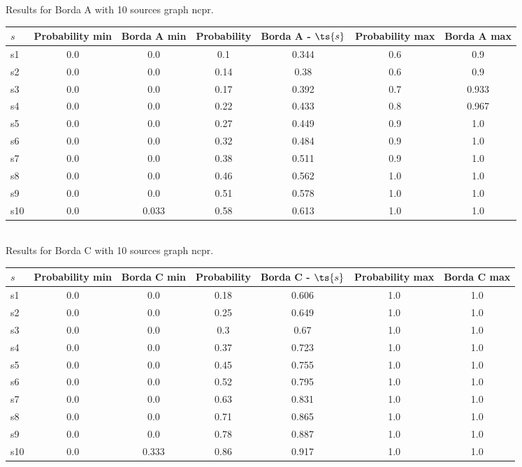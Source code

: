 \documentclass{article}
\begin{document}
\noindent Results for Borda A with 10 sources graph ncpr.

\noindent\begin{tabular}{|l|c|c|c|c|c|c|}
\hline
$s$& Probability min & Borda A min & Probability & Borda A - $\ts{s}$ & Probability max & Borda A max\\
\hline
s1 &0.0 & 0.0 & 0.1 & 0.344 & 0.6 & 0.9\\
\hline
s2 &0.0 & 0.0 & 0.14 & 0.38 & 0.6 & 0.9\\
\hline
s3 &0.0 & 0.0 & 0.17 & 0.392 & 0.7 & 0.933\\
\hline
s4 &0.0 & 0.0 & 0.22 & 0.433 & 0.8 & 0.967\\
\hline
s5 &0.0 & 0.0 & 0.27 & 0.449 & 0.9 & 1.0\\
\hline
s6 &0.0 & 0.0 & 0.32 & 0.484 & 0.9 & 1.0\\
\hline
s7 &0.0 & 0.0 & 0.38 & 0.511 & 0.9 & 1.0\\
\hline
s8 &0.0 & 0.0 & 0.46 & 0.562 & 1.0 & 1.0\\
\hline
s9 &0.0 & 0.0 & 0.51 & 0.578 & 1.0 & 1.0\\
\hline
s10 &0.0 & 0.033 & 0.58 & 0.613 & 1.0 & 1.0\\
\hline
\end{tabular}\\

\noindent Results for Borda C with 10 sources graph ncpr.

\noindent\begin{tabular}{|l|c|c|c|c|c|c|}
\hline
$s$& Probability min & Borda C min & Probability & Borda C - $\ts{s}$ & Probability max & Borda C max\\
\hline
s1 &0.0 & 0.0 & 0.18 & 0.606 & 1.0 & 1.0\\
\hline
s2 &0.0 & 0.0 & 0.25 & 0.649 & 1.0 & 1.0\\
\hline
s3 &0.0 & 0.0 & 0.3 & 0.67 & 1.0 & 1.0\\
\hline
s4 &0.0 & 0.0 & 0.37 & 0.723 & 1.0 & 1.0\\
\hline
s5 &0.0 & 0.0 & 0.45 & 0.755 & 1.0 & 1.0\\
\hline
s6 &0.0 & 0.0 & 0.52 & 0.795 & 1.0 & 1.0\\
\hline
s7 &0.0 & 0.0 & 0.63 & 0.831 & 1.0 & 1.0\\
\hline
s8 &0.0 & 0.0 & 0.71 & 0.865 & 1.0 & 1.0\\
\hline
s9 &0.0 & 0.0 & 0.78 & 0.887 & 1.0 & 1.0\\
\hline
s10 &0.0 & 0.333 & 0.86 & 0.917 & 1.0 & 1.0\\
\hline
\end{tabular}\\
\end{document}
